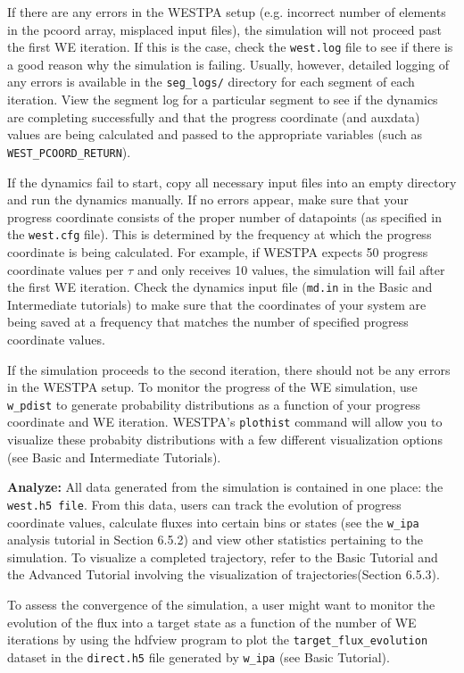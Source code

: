 \documentclass[9pt,tutorial]{livecoms}
\begin{document}
If there are any errors in the WESTPA setup (e.g. incorrect number of elements in the pcoord array, misplaced input files), the simulation will not proceed past the first WE iteration. 
If this is the case, check the \verb|west.log| file to see if there is a good reason why the simulation is failing. 
Usually, however, detailed logging of any errors is available in the \verb|seg_logs/| directory for each segment of each iteration. 
View the segment log for a particular segment to see if the dynamics are completing successfully and that the progress coordinate (and auxdata) values are being calculated and passed to the appropriate variables (such as \verb|WEST_PCOORD_RETURN|).

If the dynamics fail to start, copy all necessary input files into an empty directory and run the dynamics manually. 
If no errors appear, make sure that your progress coordinate consists of the proper number of datapoints (as specified in the \verb|west.cfg| file). 
This is determined by the frequency at which the progress coordinate is being calculated. 
For example, if WESTPA expects 50 progress coordinate values per $\tau$ and only receives 10 values, the simulation will fail after the first WE iteration. 
Check the dynamics input file (\verb|md.in| in the Basic and Intermediate tutorials) to make sure that the coordinates of your system are being saved at a frequency that matches the number of specified progress coordinate values.

If the simulation proceeds to the second iteration, there should not be any errors in the WESTPA setup. 
To monitor the progress of the WE simulation, use \verb|w_pdist| to generate probability distributions as a function of your progress coordinate and WE iteration. 
WESTPA’s \verb|plothist| command will allow you to visualize these probabity distributions with a few different visualization options (see Basic and Intermediate Tutorials).

\textbf{Analyze:} All data generated from the simulation is contained in one place: the \verb|west.h5 file|. 
From this data, users can track the evolution of progress coordinate values, calculate fluxes into certain bins or states (see the \verb|w_ipa| analysis tutorial in Section 6.5.2) and view other statistics pertaining to the simulation. 
To visualize a completed trajectory, refer to the Basic Tutorial and the Advanced Tutorial involving the visualization of trajectories(Section 6.5.3).

To assess the convergence of the simulation, a user might want to monitor the evolution of the flux into a target state as a function of the number of WE iterations by using the hdfview program to plot the \verb|target_flux_evolution| dataset in the \verb|direct.h5| file generated by \verb|w_ipa| (see Basic Tutorial). 
\end{document}
